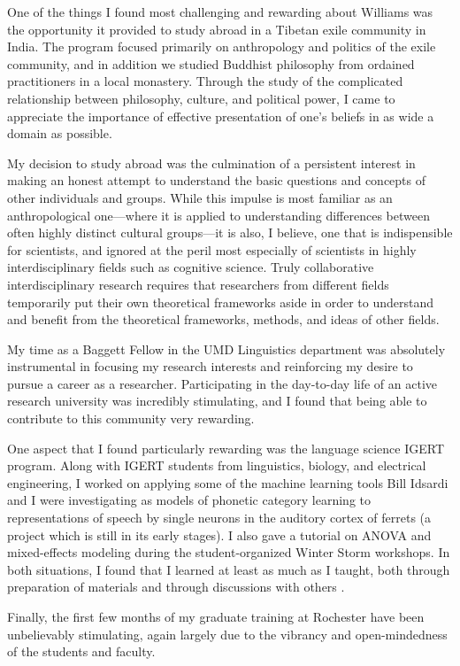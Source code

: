 \documentclass[12pt]{article}
\begin{document}
One of the things I found most challenging and rewarding about Williams was the opportunity it provided to study abroad in a Tibetan exile community in India.  The program focused primarily on anthropology and politics of the exile community, and in addition we studied Buddhist philosophy from ordained practitioners in a local monastery.  Through the study of the complicated relationship between philosophy, culture, and political power, I came to appreciate the importance of effective presentation of one's beliefs in as wide a domain as possible.

My decision to study abroad was the culmination of a persistent interest in making an honest attempt to understand the basic questions and concepts of other individuals and groups.  While this impulse is most familiar as an anthropological one---where it is applied to understanding differences between often highly distinct cultural groups---it is also, I believe, one that is indispensible for scientists, and ignored at the peril most especially of scientists in highly interdisciplinary fields such as cognitive science.  Truly collaborative interdisciplinary research requires that researchers from different fields temporarily put their own theoretical frameworks aside in order to understand and benefit from the theoretical frameworks, methods, and ideas of other fields.  



My time as a Baggett Fellow in the UMD Linguistics department was absolutely instrumental in focusing my research interests and reinforcing my desire to pursue a career as a researcher.  Participating in the day-to-day life of an active research university was incredibly stimulating, and I found that being able to contribute to this community very rewarding.  

One aspect that I found particularly rewarding was the language science IGERT program.  Along with IGERT students from linguistics, biology, and electrical engineering, I worked on applying some of the machine learning tools Bill Idsardi and I were investigating as models of phonetic category learning to representations of speech by single neurons in the auditory cortex of ferrets (a project which is still in its early stages).  I also gave a tutorial on ANOVA and mixed-effects modeling during the student-organized Winter Storm workshops.  In both situations, I found that I learned at least as much as I taught, both through preparation of materials and through discussions with others
.

Finally, the first few months of my graduate training at Rochester have been unbelievably stimulating, again largely due to the vibrancy and open-mindedness of the students and faculty.  
\end{document}
